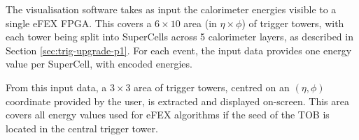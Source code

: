 The visualisation software takes as input the calorimeter energies visible to a
single \ac{eFEX} \ac{FPGA}. This covers a $6\times10$ area (in $\eta\times\phi$)
of trigger towers, with each tower being split into SuperCells across 5
calorimeter layers, as described in Section \ref{sec:trig-upgrade-p1}.
For each event, the input data provides one energy value per SuperCell, with
encoded energies.

From this input data, a $3\times3$ area of trigger towers, centred on an
$(\eta,\phi)$ coordinate provided by the user, is extracted and displayed
on-screen. This area covers all energy values used for \ac{eFEX} algorithms if
the seed of the \ac{TOB} is located in the central trigger tower.
